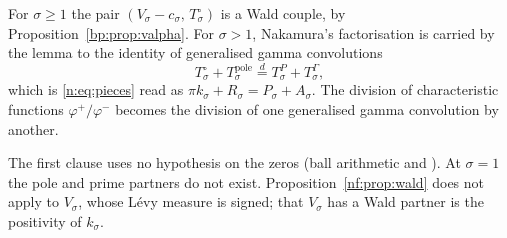 \begin{corollary}[proved]\label{nf:cor:transport}
For $\sigma\ge1$ the pair $(V_\sigma-c_\sigma,\,T^\circ_\sigma)$ is a Wald couple, by Proposition~\ref{bp:prop:valpha}. For $\sigma>1$, Nakamura's factorisation is carried by the lemma to the identity of generalised gamma convolutions
\[
T^\circ_\sigma+T^{\mathrm{pole}}_\sigma\overset d=T^P_\sigma+T^\Gamma_\sigma,
\]
which is \eqref{n:eq:pieces} read as $\pi k_\sigma+R_\sigma=P_\sigma+A_\sigma$. The division of characteristic functions $\varphi^+/\varphi^-$ becomes the division of one generalised gamma convolution by another.
\end{corollary}

The first clause uses no hypothesis on the zeros (ball arithmetic and \cite{HSW22}). At $\sigma=1$ the pole and prime partners do not exist. Proposition~\ref{nf:prop:wald} does not apply to $V_\sigma$, whose L\'evy measure is signed; that $V_\sigma$ has a Wald partner is the positivity of $k_\sigma$.

